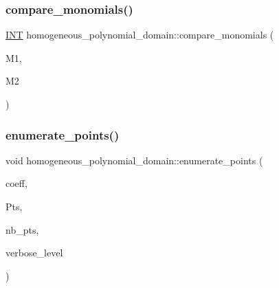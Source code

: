 \subsubsection{\texorpdfstring{compare\+\_\+monomials()}{compare\_monomials()}}
{\footnotesize\ttfamily \mbox{\hyperlink{galois_8h_a09fddde158a3a20bd2dcadb609de11dc}{I\+NT}} homogeneous\+\_\+polynomial\+\_\+domain\+::compare\+\_\+monomials (\begin{DoxyParamCaption}\item[{\mbox{\hyperlink{galois_8h_a09fddde158a3a20bd2dcadb609de11dc}{I\+NT}} $\ast$}]{M1,  }\item[{\mbox{\hyperlink{galois_8h_a09fddde158a3a20bd2dcadb609de11dc}{I\+NT}} $\ast$}]{M2 }\end{DoxyParamCaption})}

\mbox{\label{classhomogeneous__polynomial__domain_adc0868f632cc5662b7bfaf0b3d72268f}} 
\subsubsection{\texorpdfstring{enumerate\+\_\+points()}{enumerate\_points()}}
{\footnotesize\ttfamily void homogeneous\+\_\+polynomial\+\_\+domain\+::enumerate\+\_\+points (\begin{DoxyParamCaption}\item[{\mbox{\hyperlink{galois_8h_a09fddde158a3a20bd2dcadb609de11dc}{I\+NT}} $\ast$}]{coeff,  }\item[{\mbox{\hyperlink{galois_8h_a09fddde158a3a20bd2dcadb609de11dc}{I\+NT}} $\ast$}]{Pts,  }\item[{\mbox{\hyperlink{galois_8h_a09fddde158a3a20bd2dcadb609de11dc}{I\+NT}} \&}]{nb\+\_\+pts,  }\item[{\mbox{\hyperlink{galois_8h_a09fddde158a3a20bd2dcadb609de11dc}{I\+NT}}}]{verbose\+\_\+level }\end{DoxyParamCaption})}

\mbox{\label{classhomogeneous__polynomial__domain_ad3989698a38d04fc319162c376fe6343}} 
